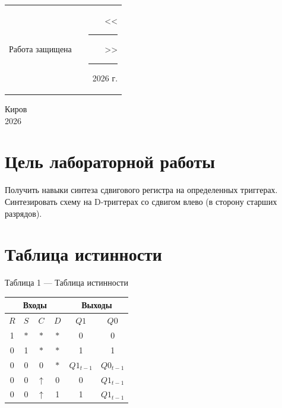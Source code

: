 \documentclass[oneside,a4paper,14pt]{extarticle}
\begin{document}
\noindent
\begin{tabular}{lp{58mm}r}
  Работа защищена &  & \hspace{5mm}<<\rule[-1mm]{5mm}{0.10mm}\/>>\rule[-1mm]{30mm}{0.10mm}\ 2026 г.
\end{tabular}
\vfill

\begin{center}
  Киров\\
  2026
\end{center}

\newpage\thispagestyle{plain}

\section{Цель лабораторной работы}
Получить навыки синтеза сдвигового регистра на определенных триггерах. Синтезировать схему на D-триггерах со сдвигом влево (в сторону старших разрядов).
\section{Таблица истинности}
\begin{center}
  Таблица 1 --- Таблица истинности \\
  \vspace{5mm}
  \begin{tabular}{|c|c|c|c||c|c|}
    \hline
    \multicolumn{4}{|c||}{Входы} & \multicolumn{2}{c|}{Выходы}                                              \\
    \hline
    $R$                          & $S$                         & $C$        & $D$ & $Q1$       & $Q0$       \\
    \hline
    1                            & $*$                         & $*$        & $*$ & 0          & 0          \\
    \hline
    0                            & 1                           & $*$        & $*$ & 1          & 1          \\
    \hline
    0                            & 0                           & 0          & $*$ & $Q1_{t-1}$ & $Q0_{t-1}$ \\
    \hline
    0                            & 0                           & $\uparrow$ & 0   & 0          & $Q1_{t-1}$ \\
    \hline
    0                            & 0                           & $\uparrow$ & 1   & 1          & $Q1_{t-1}$ \\
    \hline
  \end{tabular}
\end{center}
\end{document}
